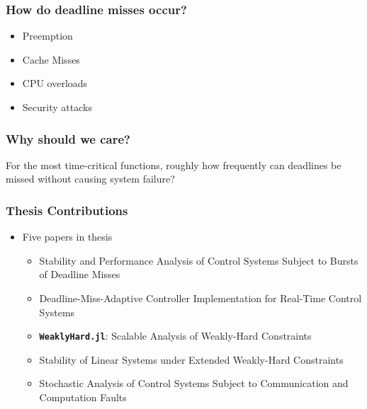 \begin{frame}
    \frametitle{How do deadline misses occur?}
    \begin{itemize}\setlength\itemsep{1em}
        \item Preemption~\parencite{Stankovic:1995, Bernat:2001}
        \item Cache Misses~\parencite{Milligan:1996, Wang:2012, Altmeyer:2014, Davis:2013}
        \item CPU overloads~\parencite{Baruah:1997, Xu:2015, Ernst:2014}
        \item Security attacks~\parencite{hashemi2018comparison, sabaliauskaite2017comparison, Knorn:2019}
    \end{itemize}
\end{frame}

\begin{frame}
    \frametitle{Why should we care?}
    For the most time-critical functions, roughly how frequently can deadlines be missed without causing system failure?~\parencite{Akesson:2020}
    \begin{figure}[h]
        \centering
        
    \end{figure}
\end{frame}


\begin{frame}
    \frametitle{Thesis Contributions}
    \begin{itemize}
        \item Five papers in thesis
            \begin{itemize}
                \item Stability and Performance Analysis of Control Systems Subject to Bursts of Deadline Misses
                \item Deadline-Miss-Adaptive Controller Implementation for Real-Time Control Systems
                \item \textbf{\tt WeaklyHard.jl}: Scalable Analysis of Weakly-Hard Constraints
                \item Stability of Linear Systems under Extended Weakly-Hard Constraints
                \item Stochastic Analysis of Control Systems Subject to Communication and Computation Faults
            \end{itemize}
    \end{itemize}
\end{frame}
